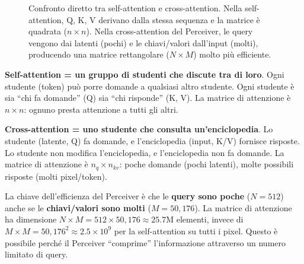 \documentclass[12pt,a4paper]{article}
\begin{document}
\begin{figure}[H]
\caption{Confronto diretto tra self-attention e cross-attention. Nella self-attention, Q, K, V derivano dalla stessa sequenza e la matrice \`e quadrata ($n \times n$). Nella cross-attention del Perceiver, le query vengono dai latenti (pochi) e le chiavi/valori dall'input (molti), producendo una matrice rettangolare ($N \times M$) molto pi\`u efficiente.}
\label{fig:self_vs_cross_attention}
\end{figure}

\begin{examplebox}
\textbf{Self-attention = un gruppo di studenti che discute tra di loro}. Ogni studente (token) pu\`o porre domande a qualsiasi altro studente. Ogni studente \`e sia ``chi fa domande'' (Q) sia ``chi risponde'' (K, V). La matrice di attenzione \`e $n \times n$: ognuno presta attenzione a tutti gli altri.

\textbf{Cross-attention = uno studente che consulta un'enciclopedia}. Lo studente (latente, Q) fa domande, e l'enciclopedia (input, K/V) fornisce risposte. Lo studente non modifica l'enciclopedia, e l'enciclopedia non fa domande. La matrice di attenzione \`e $n_q \times n_{kv}$: poche domande (pochi latenti), molte possibili risposte (molti pixel/token).
\end{examplebox}

\begin{notabox}
La chiave dell'efficienza del Perceiver \`e che le \textbf{query sono poche} ($N = 512$) anche se le \textbf{chiavi/valori sono molti} ($M = 50{,}176$). La matrice di attenzione ha dimensione $N \times M = 512 \times 50{,}176 \approx 25.7$M elementi, invece di $M \times M = 50{,}176^2 \approx 2.5 \times 10^9$ per la self-attention su tutti i pixel. Questo \`e possibile perch\'e il Perceiver ``comprime'' l'informazione attraverso un numero limitato di query.
\end{notabox}
\end{document}
